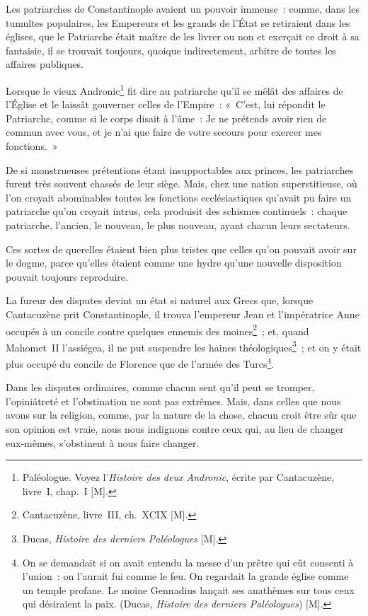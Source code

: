 \documentclass[french,twoside]{book} %
\begin{document}
Les patriarches de Constantinople avaient un pouvoir immense : comme, dans les tumultes populaires, les Empereurs et les grands de l’État se retiraient dans les églises, que le Patriarche était maître de les livrer ou non et exerçait ce droit à sa fantaisie, il se trouvait toujours, quoique indirectement, arbitre de toutes les affaires publiques.\par
Lorsque le vieux Andronic\footnote{Paléologue. Voyez l’{\itshape Histoire des deux Andronic}, écrite par Cantacuzène, livre I, chap. I [M].} fit dire au patriarche qu’il se mêlât des affaires de l’Église et le laissât gouverner celles de l’Empire : « C’est, lui répondit le Patriarche, comme si le corps disait à l’âme : Je ne prétends avoir rien de commun avec vous, et je n’ai que faire de votre secours pour exercer mes fonctions. »\par
De si monstrueuses prétentions étant insupportables aux princes, les patriarches furent très souvent chassés de leur siège. Mais, chez une nation superstitieuse, où l’on croyait abominables toutes les fonctions ecclésiastiques qu’avait pu faire un patriarche qu’on croyait intrus, cela produisit des schismes continuels : chaque patriarche, l’ancien, le nouveau, le plus nouveau, ayant chacun leurs sectateurs.\par
Ces sortes de querelles étaient bien plus tristes que celles qu’on pouvait avoir sur le dogme, parce qu’elles étaient comme une hydre qu’une nouvelle disposition pouvait toujours reproduire.\par
La fureur des disputes devint un état si naturel aux Grecs que, lorsque Cantacuzène prit Constantinople, il trouva l’empereur Jean et l’impératrice Anne occupés à un concile contre quelques ennemis des moines\footnote{Cantacuzène, livre III, ch. XCIX [M].} ; et, quand Mahomet II l’assiégea, il ne put suspendre les haines théologiques\footnote{Ducas, {\itshape Histoire des derniers Paléologues} [M].} ; et on y était plus occupé du concile de Florence que de l’armée des Turcs\footnote{On se demandait si on avait entendu la messe d’un prêtre qui eût consenti à l’union : on l’aurait fui comme le feu. On regardait la grande église comme un temple profane. Le moine Gennadius lançait ses anathèmes sur tous ceux qui désiraient la paix. (Ducas, {\itshape Histoire des derniers Paléologues}) [M].}.\par
Dans les disputes ordinaires, comme chacun sent qu’il peut se tromper, l’opiniâtreté et l’obstination ne sont pas extrêmes. Mais, dans celles que nous avons sur la religion, comme, par la nature de la chose, chacun croit être sûr que son opinion est vraie, nous nous indignons contre ceux qui, au lieu de changer eux-mêmes, s’obstinent à nous faire changer.\par
\end{document}
